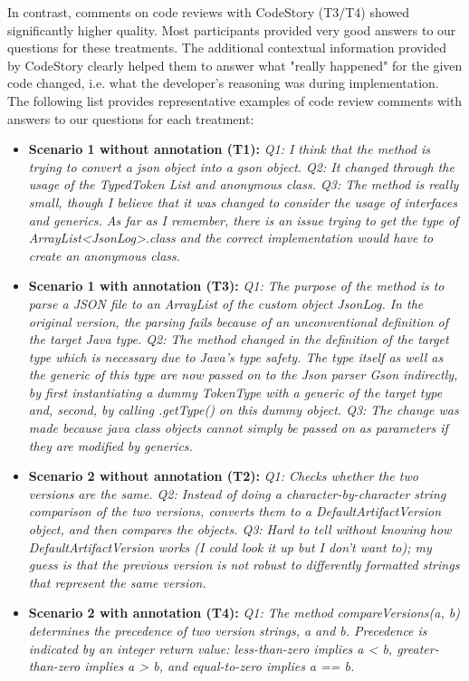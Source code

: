 \documentclass[../manifest.tex]{subfiles}
\begin{document}
In contrast, comments on code reviews with CodeStory (T3/T4) showed significantly higher quality. Most participants provided very good answers to our questions for these treatments. The additional contextual information provided by CodeStory clearly helped them to answer what "really happened" for the given code changed, i.e. what the developer's reasoning was during implementation. The following list provides representative examples of code review comments with answers to our questions for each treatment:

\begin{itemize}
  \item \textbf{Scenario 1 without annotation (T1):}
\textit{
Q1: I think that the method is trying to convert a json object into a gson object.
Q2: It changed through the usage of the TypedToken List and anonymous class.
Q3: The method is really small, though I believe that it was changed to consider the usage of interfaces and generics. As far as I remember, there is an issue trying to get the type of  ArrayList<JsonLog>.class and the correct implementation would have to create an anonymous class.
}
  \item \textbf{Scenario 1 with annotation (T3):}
\textit{
Q1: The purpose of the method is to parse a JSON file to an ArrayList of the custom object JsonLog. In the original version, the parsing fails because of an unconventional definition of the target Java type.
Q2: The method changed in the definition of the target type which is necessary due to Java's type safety. The type itself as well as the generic of this type are now passed on to the Json parser Gson indirectly, by first instantiating a dummy TokenType with a generic of the target type and, second, by calling .getType() on this dummy object.
Q3: The change was made because java class objects cannot simply be passed on as parameters if they are modified by generics.
}
  \item \textbf{Scenario 2 without annotation (T2):}
\textit{
Q1: Checks whether the two versions are the same.
Q2: Instead of doing a character-by-character string comparison of the two versions, converts them to a DefaultArtifactVersion object, and then compares the objects.
Q3: Hard to tell without knowing how DefaultArtifactVersion works (I could look it up but I don't want to); my guess is that the previous version is not robust to differently formatted strings that represent the same version.
}
  \item \textbf{Scenario 2 with annotation (T4):}
\textit{
Q1: The method compareVersions(a, b) determines the precedence of two version strings, a and b. Precedence is indicated by an integer return value: less-than-zero implies a < b, greater-than-zero implies a > b, and equal-to-zero implies a == b.
}
\end{itemize}
\end{document}
